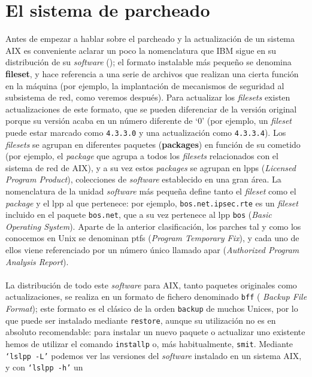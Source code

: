 \section{El sistema de parcheado}
Antes de empezar a hablar sobre el parcheado y la actualizaci\'on de un sistema 
AIX es conveniente aclarar un poco la nomenclatura que IBM sigue en su 
distribuci\'on de su {\it software} (\cite{kn:ibm00b}); el formato instalable 
m\'as peque\~no se
denomina {\bf fileset}, y hace referencia a una serie de archivos que realizan
una cierta funci\'on en la m\'aquina (por ejemplo, la implantaci\'on de 
mecanismos de seguridad al subsistema de red, como veremos despu\'es). Para
actualizar los {\it filesets} existen actualizaciones de este formato, que se
pueden diferenciar de la versi\'on original porque su versi\'on acaba en un
n\'umero diferente de `0' (por ejemplo, un {\it fileset} puede estar marcado
como {\tt 4.3.3.0} y una actualizaci\'on como {\tt 4.3.3.4}). Los {\it filesets}
se agrupan en diferentes paquetes ({\bf packages}) en funci\'on de su cometido
(por ejemplo, el {\it package} que agrupa a todos los {\it filesets} 
relacionados con el sistema de red de AIX), y a su vez estos {\it packages} se
agrupan en {\sc lpp}s ({\it Licensed Program Product}), colecciones de {\it
software} establecido en una gran \'area. La nomenclatura de la unidad {\it 
software} m\'as peque\~na define tanto el {\it fileset} como el {\it package} y 
el {\sc lpp} al que pertenece: por ejemplo, {\tt bos.net.ipsec.rte} es un {\it
fileset} incluido en el paquete {\tt bos.net}, que a su vez pertenece al {\sc
lpp} {\tt bos} ({\it Basic Operating System}). Aparte de la anterior 
clasificaci\'on, los parches tal y como los conocemos en Unix se denominan {\sc 
ptf}s ({\it Program Temporary Fix}), y cada uno de ellos viene referenciado por
un n\'umero \'unico llamado {\sc apar} ({\it Authorized Program Analysis 
Report}).\\
\\La distribuci\'on de todo este {\it software} para AIX, tanto paquetes 
originales como 
actualizaciones, se realiza en un formato de fichero denominado {\tt bff} ({\it 
Backup File Format}); este formato es el cl\'asico de la orden {\tt backup} de
muchos Unices, por lo que puede ser instalado mediante {\tt restore}, aunque su
utilizaci\'on no es en absoluto recomendable: para instalar un nuevo paquete o
actualizar uno existente hemos de utilizar el comando {\tt installp} o, m\'as
habitualmente, {\tt smit}. Mediante {\tt `lslpp -L'} podemos ver las versiones 
del {\it software} instalado en un sistema AIX, y con {\tt `lslpp -h'} un 
